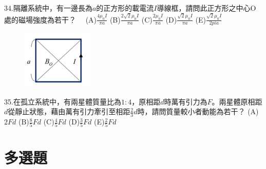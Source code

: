 \documentclass[cn,10pt,math=newtx,chinesefont=founder,device=ig]{elegantbook}
\begin{document}
\begin{example}
   34.隔離系統中，有一邊長為$a$的正方形的載電流$I$導線框，請問此正方形之中心O處的磁場強度為若干？　
   (A)$\frac{4\mu_0 I}{\pi a}$ (B)$\frac{2\sqrt{2} \mu_0 I}{\pi a}$ (C)$\frac{2\mu_0 I}{\pi a}$ (D)$\frac{\sqrt{2}\mu_0 I}{\pi a}$
    (E)$\frac{\sqrt{2}\mu_0 I}{2pi a}$
   \\
    \rightline{[成德高中教甄109]}
\end{example}
\begin{solution}
    
\end{solution}
\begin{figure}[htbp]
    \flushright
    \includegraphics[width=0.3\textwidth]{image/109成德34.png}
  \end{figure}
\newpage


\begin{example}
   35.在孤立系統中，有兩星體質量比為$1:4$，原相距$d$時萬有引力為$F$。兩星體原相距$d$從靜止狀態，藉由萬有引力牽引至相距$\frac{2}{3}d$時，請問質量較小者動能為若干？
   (A)$2Fd$ (B)$\frac{8}{5}Fd$ (C)$\frac{4}{5}Fd$ (D)$\frac{3}{5}Fd$ (E)$\frac{2}{5}Fd$
   \\
    \rightline{[成德高中教甄109]}
\end{example}
\begin{solution}
    
\end{solution}

\newpage

\section{多選題}
\end{document}
